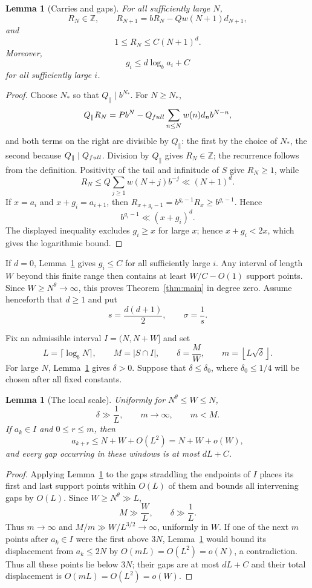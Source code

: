 \documentclass[10pt,a4paper]{amsart}
\newtheorem{lemma}[theorem]{Lemma}
\newcommand{\Z}{\mathbb Z}
\begin{document}
\begin{lemma}[Carries and gaps]\label{lem:carries}
For all sufficiently large $N$,
\[
 R_N\in\Z,\qquad
 R_{N+1}=bR_N-Qw(N+1)d_{N+1},
\]
and
\[
 1\le R_N\le C(N+1)^d.
\]
Moreover,
\[
 g_i\le d\log_ba_i+C
\]
for all sufficiently large $i$.
\end{lemma}

\begin{proof}
Choose $N_*$ so that $Q_{\parallel}\mid b^{N_*}$. For $N\ge N_*$,
\[
 Q_{\parallel}R_N
 =Pb^N-Q_{\rm full}\sum_{n\le N}w(n)d_nb^{N-n},
\]
and both terms on the right are divisible by $Q_{\parallel}$: the first by
the choice of $N_*$, the second because $Q_{\parallel}\mid Q_{\rm full}$.
Division by $Q_{\parallel}$ gives $R_N\in\Z$; the recurrence follows from the
definition. Positivity of the tail and infinitude of $S$ give $R_N\ge1$, while
\[
 R_N\le Q\sum_{j\ge1}w(N+j)b^{-j}\ll(N+1)^d.
\]
If $x=a_i$ and $x+g_i=a_{i+1}$, then
$R_{x+g_i-1}=b^{g_i-1}R_x\ge b^{g_i-1}$. Hence
\[
 b^{g_i-1}\ll(x+g_i)^d.
\]
The displayed inequality excludes $g_i\ge x$ for large $x$; hence
$x+g_i<2x$, which gives the logarithmic bound.
\end{proof}

If $d=0$, Lemma~\ref{lem:carries} gives $g_i\le C$ for all sufficiently large
$i$. Any interval of length $W$ beyond this finite range then contains at
least $W/C-O(1)$ support points. Since $W\ge N^\theta\to\infty$, this proves
Theorem~\ref{thm:main} in degree zero. Assume henceforth that $d\ge1$ and put
\[
 s=\frac{d(d+1)}2,\qquad \sigma=\frac1s.
\]

Fix an admissible interval $I=(N,N+W]$ and set
\[
 L=\lceil\log_bN\rceil,\qquad
 M=|S\cap I|,\qquad
 \delta=\frac MW,\qquad
 m=\left\lfloor L\sqrt\delta\right\rfloor.
\]
For large $N$, Lemma~\ref{lem:carries} gives $\delta>0$. Suppose that
$\delta\le\delta_0$, where $\delta_0\le1/4$ will be chosen after all fixed
constants.

\begin{lemma}[The local scale]\label{lem:localscale}
Uniformly for $N^\theta\le W\le N$,
\[
 \delta\gg\frac1L,\qquad m\to\infty,\qquad m<M.
\]
If $a_k\in I$ and $0\le r\le m$, then
\[
 a_{k+r}\le N+W+O(L^2)=N+W+o(W),
\]
and every gap occurring in these windows is at most $dL+C$.
\end{lemma}

\begin{proof}
Applying Lemma~\ref{lem:carries} to the gaps straddling the endpoints of $I$
places its first and last support points within $O(L)$ of them and bounds all
intervening gaps by $O(L)$. Since
$W\ge N^\theta\gg L$,
\[
 M\gg\frac WL,\qquad \delta\gg\frac1L.
\]
Thus $m\to\infty$ and $M/m\gg W/L^{3/2}\to\infty$, uniformly in $W$.
If one of the next $m$ points after $a_k\in I$ were the first above $3N$,
Lemma~\ref{lem:carries} would bound its displacement from $a_k\le2N$ by
$O(mL)=O(L^2)=o(N)$, a contradiction. Thus all these points lie below $3N$;
their gaps are at most $dL+C$ and their total displacement is
$O(mL)=O(L^2)=o(W)$.
\end{proof}
\end{document}
